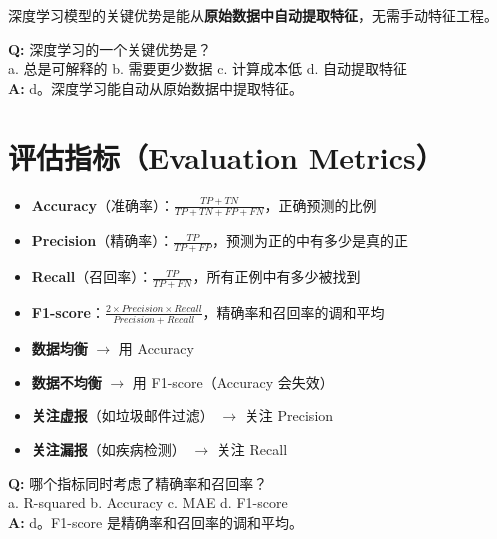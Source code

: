 \documentclass[11pt,a4paper]{article}
\begin{document}
\begin{bluebox}[深度学习的关键优势]
深度学习模型的关键优势是能从\textbf{原始数据中自动提取特征}，无需手动特征工程。
\end{bluebox}

\begin{examplebox}[例题：深度学习优势]
\textbf{Q:} 深度学习的一个关键优势是？\\
a. 总是可解释的 \quad b. 需要更少数据 \quad c. 计算成本低 \quad d. 自动提取特征\\
\textbf{A:} d。深度学习能自动从原始数据中提取特征。
\end{examplebox}

\section{评估指标（Evaluation Metrics）}

\begin{bluebox}[核心评估指标]
\begin{itemize}
    \item \textbf{Accuracy}（准确率）：$\frac{TP + TN}{TP + TN + FP + FN}$，正确预测的比例
    \item \textbf{Precision}（精确率）：$\frac{TP}{TP + FP}$，预测为正的中有多少是真的正
    \item \textbf{Recall}（召回率）：$\frac{TP}{TP + FN}$，所有正例中有多少被找到
    \item \textbf{F1-score}：$\frac{2 \times Precision \times Recall}{Precision + Recall}$，精确率和召回率的调和平均
\end{itemize}
\end{bluebox}

\begin{orangebox}[指标选择指南]
\begin{itemize}
    \item \textbf{数据均衡} $\rightarrow$ 用 Accuracy
    \item \textbf{数据不均衡} $\rightarrow$ 用 F1-score（Accuracy 会失效）
    \item \textbf{关注虚报}（如垃圾邮件过滤） $\rightarrow$ 关注 Precision
    \item \textbf{关注漏报}（如疾病检测） $\rightarrow$ 关注 Recall
\end{itemize}
\end{orangebox}

\begin{examplebox}[例题：综合指标]
\textbf{Q:} 哪个指标同时考虑了精确率和召回率？\\
a. R-squared \quad b. Accuracy \quad c. MAE \quad d. F1-score\\
\textbf{A:} d。F1-score 是精确率和召回率的调和平均。
\end{examplebox}
\end{document}
